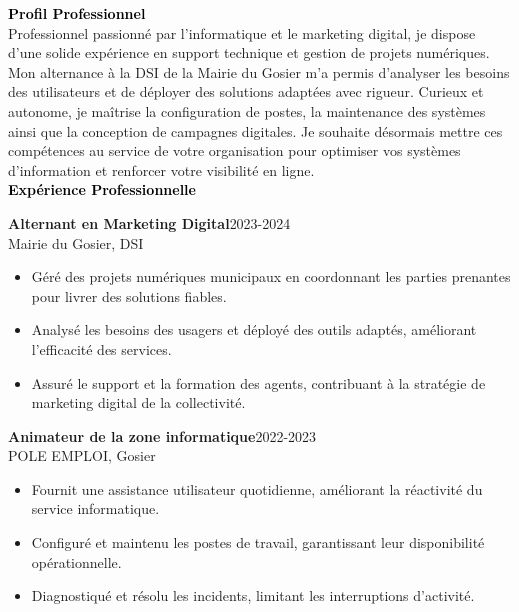 \documentclass{article}
\begin{document}
\begin{paracol}{2}
\switchcolumn
\color{black}

\textcolor{black}{\Large \textbf{Profil Professionnel}} \\[2pt]
Professionnel passionné par l’informatique et le marketing digital, je dispose d’une solide expérience en support technique et gestion de projets numériques. Mon alternance à la DSI de la Mairie du Gosier m’a permis d’analyser les besoins des utilisateurs et de déployer des solutions adaptées avec rigueur. Curieux et autonome, je maîtrise la configuration de postes, la maintenance des systèmes ainsi que la conception de campagnes digitales. Je souhaite désormais mettre ces compétences au service de votre organisation pour optimiser vos systèmes d’information et renforcer votre visibilité en ligne. \\[8pt]

\textcolor{black}{\Large \textbf{Expérience Professionnelle}} \\[2pt]
\colorbox{maincolor}{%
  \begin{minipage}{\linewidth}
    \noindent
    \textbf{Alternant en Marketing Digital}\hfill 2023-2024\\
    Mairie du Gosier, DSI\\[-0.3em]
    \begin{itemize}[leftmargin=*]
      \item Géré des projets numériques municipaux en coordonnant les parties prenantes pour livrer des solutions fiables. \item Analysé les besoins des usagers et déployé des outils adaptés, améliorant l’efficacité des services. \item Assuré le support et la formation des agents, contribuant à la stratégie de marketing digital de la collectivité.
    \end{itemize}
  \end{minipage}}

\vspace{3mm}

\colorbox{maincolor}{%
  \begin{minipage}{\linewidth}
    \noindent
    \textbf{Animateur de la zone informatique}\hfill 2022-2023\\
    POLE EMPLOI, Gosier\\[-0.3em]
    \begin{itemize}[leftmargin=*]
      \item Fournit une assistance utilisateur quotidienne, améliorant la réactivité du service informatique. \item Configuré et maintenu les postes de travail, garantissant leur disponibilité opérationnelle. \item Diagnostiqué et résolu les incidents, limitant les interruptions d’activité.
    \end{itemize}
  \end{minipage}}


\end{paracol}
\end{document}
